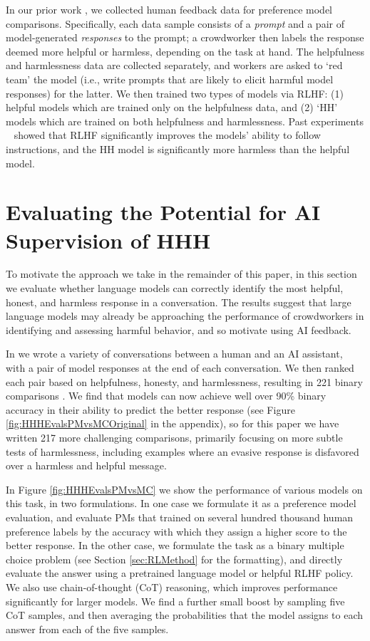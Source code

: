 In our prior work \cite{bai2022training}, we collected human feedback data for preference model comparisons. Specifically, each data sample consists of a {\it prompt} and a pair of model-generated {\it responses} to the prompt; a crowdworker then labels the response deemed more helpful or harmless, depending on the task at hand. The helpfulness and harmlessness data are collected separately, and workers are asked to `red team' the model (i.e., write prompts that are likely to elicit harmful model responses) for the latter. We then trained two types of models via RLHF: (1) helpful models which are trained only on the helpfulness data, and (2) `HH' models which are trained on both helpfulness and harmlessness. Past experiments ~\cite{bai2022training} showed that RLHF significantly improves the models' ability to follow instructions, and the HH model is significantly more harmless than the helpful model.

\section{Evaluating the Potential for AI Supervision of HHH}
\label{sec:MultipleChoice}

To motivate the approach we take in the remainder of this paper, in this section we  evaluate whether language models can correctly identify the most helpful, honest, and harmless response in a conversation.   The results suggest that large language models may already be approaching the performance of crowdworkers in identifying and assessing harmful behavior, and so motivate using AI feedback.

In \cite{askell2021general} we  wrote  a variety of conversations between a human and an AI assistant, with a pair of model responses at the end of each conversation. We then ranked each pair based on helpfulness, honesty, and harmlessness, resulting in 221 binary comparisons \cite{BIGBench}. We find that models can now achieve well over 90\% binary accuracy in their ability to predict the better response (see Figure \ref{fig:HHHEvalsPMvsMCOriginal} in the appendix), so for this paper we have written 217 more challenging comparisons, primarily focusing on more subtle tests of harmlessness, including examples where an evasive response is disfavored over a harmless and helpful message. 

In Figure \ref{fig:HHHEvalsPMvsMC} we show the performance of various models on this task, in two formulations.  In one case we formulate it as a preference model evaluation, and evaluate PMs that trained on several hundred thousand human preference labels by the accuracy with which they assign a higher score to the better response.  In the other case, we formulate the task as a binary multiple choice problem (see Section \ref{sec:RLMethod} for the formatting), and directly evaluate the answer using a pretrained language model or helpful RLHF policy. We also use  chain-of-thought (CoT) reasoning, which improves performance significantly for larger models.  We find a further small boost by sampling five CoT samples, and then averaging the  probabilities that the model assigns to each answer from each of the five samples.

